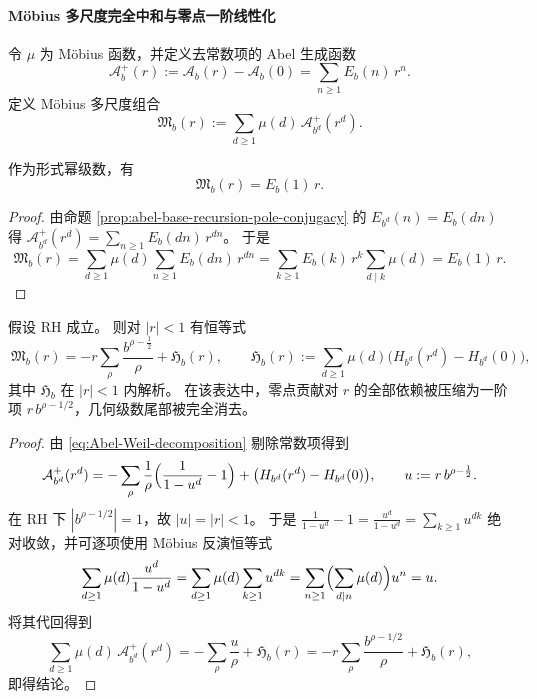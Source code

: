 \paragraph{Möbius 多尺度完全中和与零点一阶线性化}
令 \(\mu\) 为 Möbius 函数，并定义去常数项的 Abel 生成函数
\[
\mathcal A_b^+(r):=\mathcal A_b(r)-\mathcal A_b(0)=\sum_{n\ge 1}E_b(n)\,r^n.
\]
定义 Möbius 多尺度组合
\[
\boxed{\ \mathfrak M_b(r):=\sum_{d\ge 1}\mu(d)\,\mathcal A_{b^d}^+(r^d).\ }
\]

\begin{proposition}[完全中和的形式恒等式]\label{prop:abel-mobius-neutralization-formal}
作为形式幂级数，有
\[
\boxed{\ \mathfrak M_b(r)=E_b(1)\,r.\ }
\]
\end{proposition}
\begin{proof}
由命题 \ref{prop:abel-base-recursion-pole-conjugacy} 的 \(E_{b^d}(n)=E_b(dn)\) 得
\(
\mathcal A_{b^d}^+(r^d)=\sum_{n\ge 1}E_b(dn)\,r^{dn}
\)。
于是
\[
\mathfrak M_b(r)
=\sum_{d\ge 1}\mu(d)\sum_{n\ge 1}E_b(dn)\,r^{dn}
=\sum_{k\ge 1}E_b(k)\,r^k\sum_{d\mid k}\mu(d)
=E_b(1)\,r.
\]
\end{proof}

\begin{theorem}[RH 下的零点几何尾项线性化]\label{thm:abel-mobius-linearization}
假设 RH 成立。
则对 \(|r|<1\) 有恒等式
\[
\boxed{\ \mathfrak M_b(r)
=-r\sum_{\rho}\frac{b^{\rho-\frac12}}{\rho}+\mathfrak H_b(r),
\qquad
\mathfrak H_b(r):=\sum_{d\ge 1}\mu(d)\bigl(H_{b^d}(r^d)-H_{b^d}(0)\bigr),\ }
\]
其中 \(\mathfrak H_b\) 在 \(|r|<1\) 内解析。
在该表达中，零点贡献对 \(r\) 的全部依赖被压缩为一阶项 \(r\,b^{\rho-1/2}\)，几何级数尾部被完全消去。
\end{theorem}
\begin{proof}
由 \eqref{eq:Abel-Weil-decomposition} 剔除常数项得到
\[
\mathcal A_{b^d}^+(r^d)
=-\sum_{\rho}\frac{1}{\rho}\Bigl(\frac{1}{1-u^d}-1\Bigr)+\bigl(H_{b^d}(r^d)-H_{b^d}(0)\bigr),
\qquad u:=r\,b^{\rho-\frac12}.
\]
在 RH 下 \(|b^{\rho-1/2}|=1\)，故 \(|u|=|r|<1\)。
于是
\(
\frac{1}{1-u^d}-1=\frac{u^d}{1-u^d}=\sum_{k\ge 1}u^{dk}
\)
绝对收敛，并可逐项使用 Möbius 反演恒等式
\[
\sum_{d\ge 1}\mu(d)\frac{u^d}{1-u^d}
=\sum_{d\ge 1}\mu(d)\sum_{k\ge 1}u^{dk}
=\sum_{n\ge 1}\Bigl(\sum_{d\mid n}\mu(d)\Bigr)u^n
=u.
\]
将其代回得到
\[
\sum_{d\ge 1}\mu(d)\,\mathcal A_{b^d}^+(r^d)
=-\sum_{\rho}\frac{u}{\rho}+\mathfrak H_b(r)
=-r\sum_{\rho}\frac{b^{\rho-1/2}}{\rho}+\mathfrak H_b(r),
\]
即得结论。
\end{proof}

